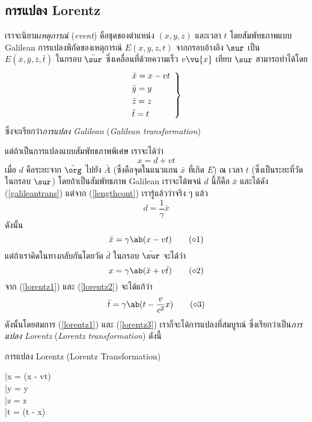 \subsection{การแปลง Lorentz}

เราจะนิยาม\emph{เหตุการณ์} (\emph{event}) คือชุดของตำแหน่ง $(x,y,z)$ และเวลา $t$ โดยสัมพัทธภาพแบบ Galilean การแปลงพิกัดของเหตุการณ์ $E(x,y,z,t)$ จากกรอบอ้างอิง $\sur$ เป็น $E(\bar{x}, \bar{y}, \bar{z}, \bar{t})$ ในกรอบ $\bar{\sur}$ ซึ่งเคลื่อนที่ด้วยความเร็ว $v\vu{x}$ เทียบ $\sur$ สามารถทำได้โดย
\begin{equation}
    \begin{rcases}
        \bar{x} = x - vt\hspace{5pt}\\
        \bar{y} = y\\
        \bar{z} = z\\
        \bar{t} = t
    \end{rcases}\label{galileantrans}
\end{equation}
ซึ่งจะเรียกว่า\emph{การแปลง Galilean} (\emph{Galilean transformation})

แต่ถ้าเป็นการแปลงแบบสัมพัทธภาพพิเศษ เราจะได้ว่า
\[
x = d + vt
\]
เมื่อ $d$ คือระยะจาก $\bar{\org}$ ไปยัง $\bar{A}$ (ซึ่งคือจุดในแนวแกน $\bar{x}$ ที่เกิด $E$) ณ เวลา $t$ (ซึ่งเป็นระยะที่วัดในกรอบ $\sur$) โดยถ้าเป็นสัมพัทธภาพ Galilean เราจะได้พจน์ $d$ นี้ก็คือ $\bar{x}$ และได้ดัง (\ref{galileantrans}) แต่จาก (\ref{lengthcont}) เรารู้แล้วว่าจริง ๆ แล้ว
\[
d = \frac{1}{\gamma}\bar{x}
\]
ดังนั้น
\begin{equation}
    \bar{x} = \gamma\ab(x - vt)\tag{$\diamond$1}\label{lorentz1}
\end{equation}
แต่ถ้าเราคิดในทางกลับกันโดยวัด $\bar{d}$ ในกรอบ $\bar{\sur}$ จะได้ว่า
\begin{equation}
    x = \gamma\ab(\bar{x} + v\bar{t})\tag{$\diamond$2}\label{lorentz2}
\end{equation}
จาก (\ref{lorentz1}) และ (\ref{lorentz2}) จะได้แก้ว่า
\begin{equation}
    \bar{t} = \gamma\ab(t - \frac{v}{c^2}x)\tag{$\diamond$3}\label{lorentz3}
\end{equation}
ดังนั้นโดยสมการ (\ref{lorentz1}) และ (\ref{lorentz3}) เราก็จะได้การแปลงที่สมบูรณ์ ซึ่งเรียกว่าเป็น\emph{การแปลง Lorentz} (\emph{Lorentz transformation}) ดังนี้
\begin{eqbox}{การแปลง Lorentz (Lorentz Transformation)}
    \begin{rcases}
        \bar{x} = \gamma(x - vt)\hspace{5pt}\\
        \bar{y} = y\\
        \bar{z} = z\\
        \bar{t} = \gamma\ab(t - x)
    \end{rcases}\label{lorentztrans}
\end{eqbox}

